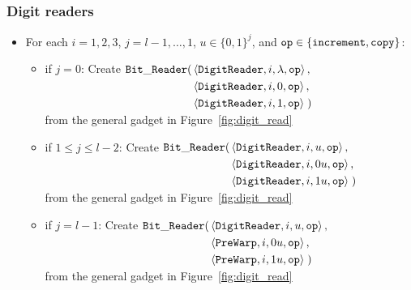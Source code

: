 \subsubsection{ Digit readers }

\begin{itemize}

\item For each $i = 1,2,3$,
               $j = l-1,\ldots,1$,
               $u \in \{0, 1\}^j$, and
               ${\tt op} \in \{{\tt increment}, {\tt copy} \}$:
    \begin{itemize}
        \item if $j = 0$:
        Create
        $\begin{aligned}[t]
            {\tt Bit\_Reader}(& \left\langle {\tt DigitReader}, i, \lambda, {\tt op} \right\rangle, \\
                     & \left\langle {\tt DigitReader}, i, 0, {\tt op} \right\rangle, \\
                     & \left\langle {\tt DigitReader}, i, 1, {\tt op} \right\rangle \;)
        \end{aligned}$\\
        from the general gadget in Figure~\ref{fig:digit_read}

        \item if $1 \leqslant j \leqslant l -2$:
        Create
        $\begin{aligned}[t]
        {\tt Bit\_Reader}(& \left\langle {\tt DigitReader}, i, u, {\tt op} \right\rangle, \\
                 & \left\langle {\tt DigitReader}, i, 0u, {\tt op} \right\rangle, \\
                 & \left\langle {\tt DigitReader}, i, 1u, {\tt op} \right\rangle \;)
        \end{aligned}$\\
        from the general gadget in Figure~\ref{fig:digit_read}

        \item if $j = l - 1$:
        Create
        $\begin{aligned}[t]
            {\tt Bit\_Reader}(& \left\langle {\tt DigitReader}, i, u, {\tt op} \right\rangle, \\
                     & \left\langle {\tt PreWarp}, i, 0u, {\tt op} \right\rangle, \\
                     & \left\langle {\tt PreWarp}, i, 1u, {\tt op} \right\rangle \;)
        \end{aligned}$\\
        from the general gadget in Figure~\ref{fig:digit_read}

    \end{itemize}


\end{itemize}

